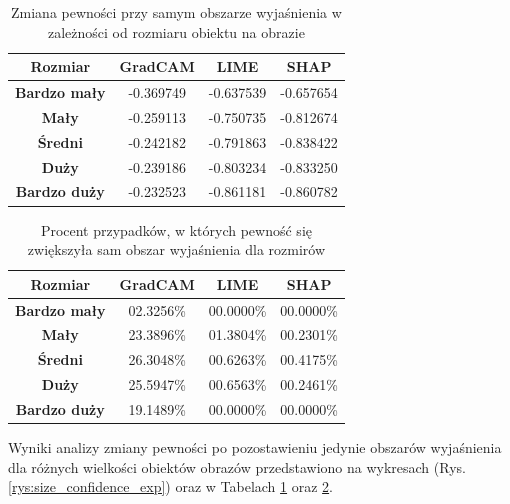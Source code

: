 \begin{table}[h]
	\centering
	\begin{tabular}{|c|c|c|c|}
		\hline
		\textbf{Rozmiar}     & \textbf{GradCAM} & \textbf{LIME} & \textbf{SHAP} \\
		\hline
		\textbf{Bardzo mały} & -0.369749        & -0.637539     & -0.657654     \\
		\hline
		\textbf{Mały}        & -0.259113        & -0.750735     & -0.812674     \\
		\hline
		\textbf{Średni}      & -0.242182        & -0.791863     & -0.838422     \\
		\hline
		\textbf{Duży}        & -0.239186        & -0.803234     & -0.833250     \\
		\hline
		\textbf{Bardzo duży} & -0.232523        & -0.861181     & -0.860782     \\
		\hline
	\end{tabular}
	\caption{Zmiana pewności przy samym obszarze wyjaśnienia w zależności od rozmiaru obiektu na obrazie}
	\label{tab:size_confidence_exp}
\end{table}

\begin{table}[h]
	\centering
	\begin{tabular}{|c|c|c|c|}
		\hline
		\textbf{Rozmiar}     & \textbf{GradCAM} & \textbf{LIME} & \textbf{SHAP} \\
		\hline
		\textbf{Bardzo mały} & 02.3256\%        & 00.0000\%     & 00.0000\%     \\
		\hline
		\textbf{Mały}        & 23.3896\%        & 01.3804\%     & 00.2301\%     \\
		\hline
		\textbf{Średni}      & 26.3048\%        & 00.6263\%     & 00.4175\%     \\
		\hline
		\textbf{Duży}        & 25.5947\%        & 00.6563\%     & 00.2461\%     \\
		\hline
		\textbf{Bardzo duży} & 19.1489\%        & 00.0000\%     & 00.0000\%     \\
		\hline
	\end{tabular}
	\caption{Procent przypadków, w których pewność się zwiększyła sam obszar wyjaśnienia dla rozmirów}
	\label{tab:size_confidence_exp_percent}
\end{table}

Wyniki analizy zmiany pewności po pozostawieniu jedynie obszarów wyjaśnienia dla różnych wielkości obiektów obrazów przedstawiono na wykresach (Rys. \ref{rys:size_confidence_exp}) oraz w Tabelach \ref{tab:size_confidence_exp} oraz \ref{tab:size_confidence_exp_percent}.

